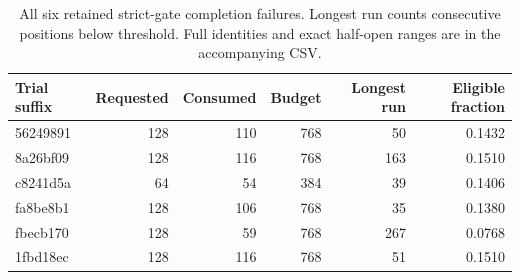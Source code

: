 \begin{table}[H]
\centering\small
\begin{tabular}{lrrrrr}
\toprule
Trial suffix & Requested & Consumed & Budget & Longest run & Eligible fraction \\
\midrule
56249891 & 128 & 110 & 768 & 50 & 0.1432 \\
8a26bf09 & 128 & 116 & 768 & 163 & 0.1510 \\
c8241d5a & 64 & 54 & 384 & 39 & 0.1406 \\
fa8be8b1 & 128 & 106 & 768 & 35 & 0.1380 \\
fbecb170 & 128 & 59 & 768 & 267 & 0.0768 \\
1fbd18ec & 128 & 116 & 768 & 51 & 0.1510 \\
\bottomrule
\end{tabular}
\caption{All six retained strict-gate completion failures. Longest run counts consecutive positions below threshold. Full identities and exact half-open ranges are in the accompanying CSV.}\label{tab:v4-failures}
\end{table}
